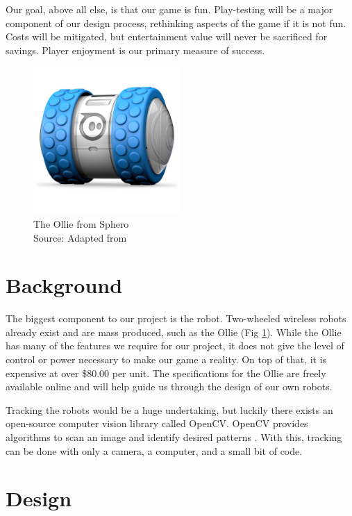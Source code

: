 \documentclass[11pt]{ieeeconf}
\begin{document}
Our goal, above all else, is that our game is fun. Play-testing will be a major component of our design process, rethinking aspects of the game if it is not fun. Costs will be mitigated, but entertainment value will never be sacrificed for savings. Player enjoyment is our primary measure of success.

\begin{figure}[H]
\centering
\captionsetup{justification=centering}
\includegraphics[width=0.5\textwidth]{images/SumoBot.png}
\caption{The Ollie from Sphero\\Source: Adapted from \cite{ollie:19}}
\label{Ollie}
\end{figure}

\section{Background}

The biggest component to our project is the robot. Two-wheeled wireless robots already exist and are mass produced, such as the Ollie (Fig \ref{Ollie}). While the Ollie has many of the features we require for our project, it does not give the level of control or power necessary to make our game a reality. On top of that, it is expensive at over \$80.00 per unit. The specifications for the Ollie are freely available online and will help guide us through the design of our own robots.

Tracking the robots would be a huge undertaking, but luckily there exists an open-source computer vision library called OpenCV. OpenCV provides algorithms to scan an image and identify desired patterns \cite{opencv:19}. With this, tracking can be done with only a camera, a computer, and a small bit of code. 

\section{Design}
\end{document}
